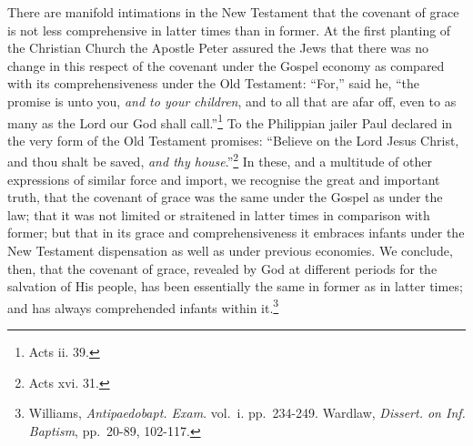 \documentclass[english,]{book}
\begin{document}
There are manifold intimations in the New Testament that the covenant of grace is not less comprehensive in latter times than in former. At the first planting of the Christian Church the Apostle Peter assured the Jews that there was no change in this respect of the covenant under the Gospel economy as compared with its comprehensiveness under the Old Testament: ``For,'' said he, ``the promise is unto you, \emph{and to your children}, and to all that are afar off, even to as many as the Lord our God shall call.''\footnote{Acts ii. 39.} To the Philippian jailer Paul declared in the very form of the Old Testament promises: ``Believe on the Lord Jesus Christ, and thou shalt be saved, \emph{and thy house}.''\footnote{Acts xvi. 31.} In these, and a multitude of other expressions of similar force and import, we recognise the great and important truth, that the covenant of grace was the same under the Gospel as under the law; that it was not limited or straitened in latter times in comparison with former; but that in its grace and comprehensiveness it embraces infants under the New Testament dispensation as well as under previous economies. We conclude, then, that the covenant of grace, revealed by God at different periods for the salvation of His people, has been essentially the same in former as in latter times; and has always comprehended infants within it.\footnote{Williams, \emph{Antipaedobapt. Exam}. vol.~i. pp.~234-249. Wardlaw, \emph{Dissert. on Inf. Baptism}, pp.~20-89, 102-117.}
\end{document}
